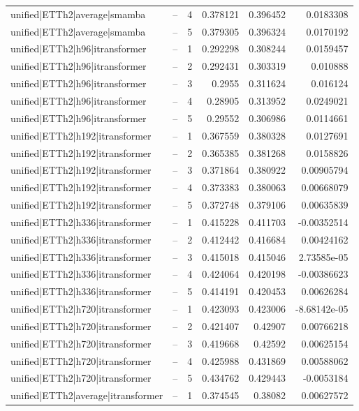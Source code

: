 \begin{longtable}{llrrrr}
unified|ETTh2|average|smamba & -- & 4 & 0.378121 & 0.396452 & 0.0183308 \\
unified|ETTh2|average|smamba & -- & 5 & 0.379305 & 0.396324 & 0.0170192 \\
unified|ETTh2|h96|itransformer & -- & 1 & 0.292298 & 0.308244 & 0.0159457 \\
unified|ETTh2|h96|itransformer & -- & 2 & 0.292431 & 0.303319 & 0.010888 \\
unified|ETTh2|h96|itransformer & -- & 3 & 0.2955 & 0.311624 & 0.016124 \\
unified|ETTh2|h96|itransformer & -- & 4 & 0.28905 & 0.313952 & 0.0249021 \\
unified|ETTh2|h96|itransformer & -- & 5 & 0.29552 & 0.306986 & 0.0114661 \\
unified|ETTh2|h192|itransformer & -- & 1 & 0.367559 & 0.380328 & 0.0127691 \\
unified|ETTh2|h192|itransformer & -- & 2 & 0.365385 & 0.381268 & 0.0158826 \\
unified|ETTh2|h192|itransformer & -- & 3 & 0.371864 & 0.380922 & 0.00905794 \\
unified|ETTh2|h192|itransformer & -- & 4 & 0.373383 & 0.380063 & 0.00668079 \\
unified|ETTh2|h192|itransformer & -- & 5 & 0.372748 & 0.379106 & 0.00635839 \\
unified|ETTh2|h336|itransformer & -- & 1 & 0.415228 & 0.411703 & -0.00352514 \\
unified|ETTh2|h336|itransformer & -- & 2 & 0.412442 & 0.416684 & 0.00424162 \\
unified|ETTh2|h336|itransformer & -- & 3 & 0.415018 & 0.415046 & 2.73585e-05 \\
unified|ETTh2|h336|itransformer & -- & 4 & 0.424064 & 0.420198 & -0.00386623 \\
unified|ETTh2|h336|itransformer & -- & 5 & 0.414191 & 0.420453 & 0.00626284 \\
unified|ETTh2|h720|itransformer & -- & 1 & 0.423093 & 0.423006 & -8.68142e-05 \\
unified|ETTh2|h720|itransformer & -- & 2 & 0.421407 & 0.42907 & 0.00766218 \\
unified|ETTh2|h720|itransformer & -- & 3 & 0.419668 & 0.42592 & 0.00625154 \\
unified|ETTh2|h720|itransformer & -- & 4 & 0.425988 & 0.431869 & 0.00588062 \\
unified|ETTh2|h720|itransformer & -- & 5 & 0.434762 & 0.429443 & -0.0053184 \\
unified|ETTh2|average|itransformer & -- & 1 & 0.374545 & 0.38082 & 0.00627572 \\

\end{longtable}
